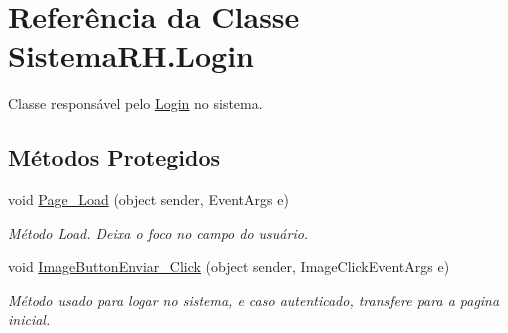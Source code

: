 \hypertarget{class_sistema_r_h_1_1_login}{
\section{Referência da Classe SistemaRH.Login}
\label{class_sistema_r_h_1_1_login}
}


Classe responsável pelo \hyperlink{class_sistema_r_h_1_1_login}{Login} no sistema.  


\subsection*{Métodos Protegidos}
\begin{DoxyCompactItemize}
\item 
void \hyperlink{class_sistema_r_h_1_1_login_ac545d4c05a06f7d009fa231612c854ee}{Page\_\-Load} (object sender, EventArgs e)
\begin{DoxyCompactList}\small\item\em Método Load. Deixa o foco no campo do usuário. \item\end{DoxyCompactList}\item 
void \hyperlink{class_sistema_r_h_1_1_login_aa4f211c4c1a85a67b3f4c4c3d4419388}{ImageButtonEnviar\_\-Click} (object sender, ImageClickEventArgs e)
\begin{DoxyCompactList}\small\item\em Método usado para logar no sistema, e caso autenticado, transfere para a pagina inicial. \item\end{DoxyCompactList}\end{DoxyCompactItemize}
